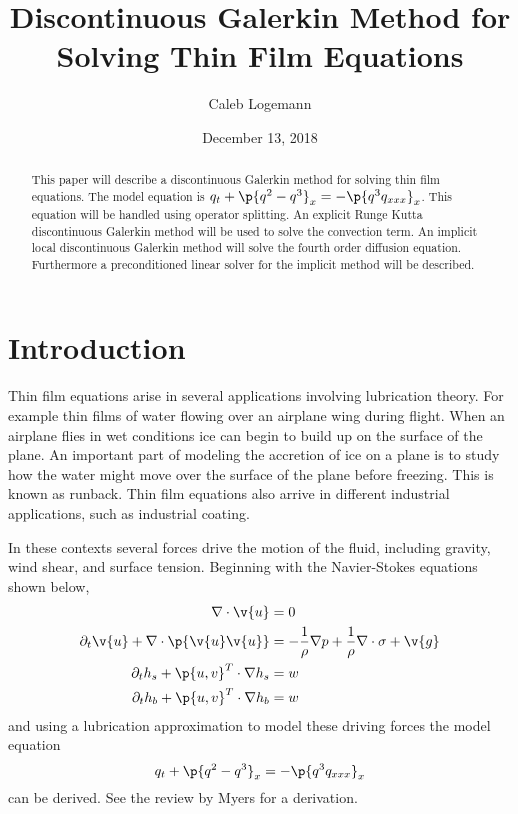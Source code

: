 \documentclass[11pt, oneside]{article}
\title{Discontinuous Galerkin Method for Solving Thin Film Equations}
\author{Caleb Logemann}
\date{December 13, 2018} %
\begin{document}
\maketitle

\begin{abstract}
  This paper will describe a discontinuous Galerkin method for solving
  thin film equations. The model equation is
  $q_t + \p{q^2 - q^3}_x = -\p{q^3 q_{xxx}}_x$.
  This equation will be handled using operator splitting.
  An explicit Runge Kutta discontinuous Galerkin method will be used to solve the
  convection term.
  An implicit local discontinuous Galerkin method will solve the fourth order
  diffusion equation.
  Furthermore a preconditioned linear solver for the implicit method will be
  described.
\end{abstract}

\section{Introduction}
  Thin film equations arise in several applications involving lubrication theory.
  For example thin films of water flowing over an airplane wing during flight.
  When an airplane flies in wet conditions ice can begin to build up on the
  surface of the plane.
  An important part of modeling the accretion of ice on a plane is to study how
  the water might move over the surface of the plane before freezing.
  This is known as runback.
  Thin film equations also arrive in different industrial applications, such as
  industrial coating.

  In these contexts several forces drive the motion of the fluid, including
  gravity, wind shear, and surface tension.
  Beginning with the Navier-Stokes equations shown below,
  \begin{align*}
    \nabla \cdot \v{u} &= 0 \\
    \partial_t \v{u} + \nabla \cdot \p{\v{u}\v{u}} &= - \frac{1}{\rho} \nabla p + \frac{1}{\rho}\nabla \cdot \sigma + \v{g} \\
    \partial_t h_s + \p{u, v}^T \cdot \nabla h_s &= w \\
    \partial_t h_b + \p{u, v}^T \cdot \nabla h_b &= w
  \end{align*}
  and using a lubrication approximation to model these driving forces the model
  equation
  \[
    q_t + \p{q^2 - q^3}_x = -\p{q^3 q_{xxx}}_x
  \]
  can be derived.
  See the review by Myers\cite{myersReview} for a derivation.
\end{document}
